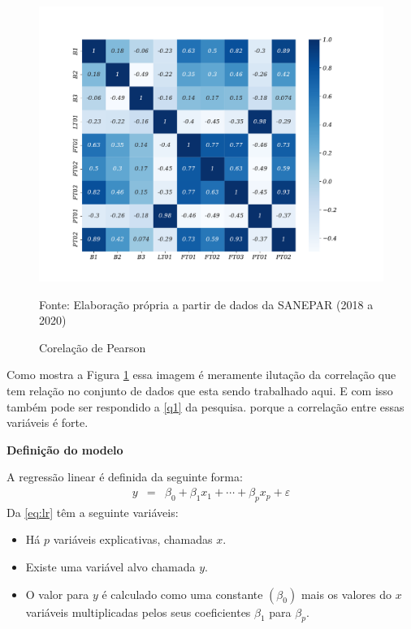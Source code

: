 \begin{figure}[H]
	\centering
	\caption{Corelação de Pearson }
	\label{fig:person}
	\includegraphics[width=0.9\linewidth]{Apendices/Figuras/modelagem-24h/person}
	
	Fonte: Elaboração própria a partir de dados da SANEPAR (2018 a 2020)
\end{figure}

Como mostra a Figura \ref{fig:person} essa imagem é meramente ilutação da correlação que tem relação no conjunto de dados que esta sendo trabalhado aqui. E com isso também pode ser respondido a \ref{q1} da pesquisa. porque a correlação entre essas variáveis é forte.

\textbf{Definição do modelo}

A regressão linear é definida da seguinte forma:
\begin{eqnarray}
y&=&\beta_0+\beta_1 x_1+\cdots+\beta_p x_p+\varepsilon\label{eq:lr}
\end{eqnarray}
Da \eqref{eq:lr} têm a seguinte variáveis:

\begin{itemize}
	\item  Há $p$ variáveis explicativas, chamadas $x$.
\item Existe uma variável alvo chamada $y$.
\item  O valor para $y$ é calculado como uma constante $\left(\beta_0\right)$ mais os valores do $x$ variáveis multiplicadas pelos seus coeficientes $\beta_1$ para $\beta_p$.
\end{itemize}

